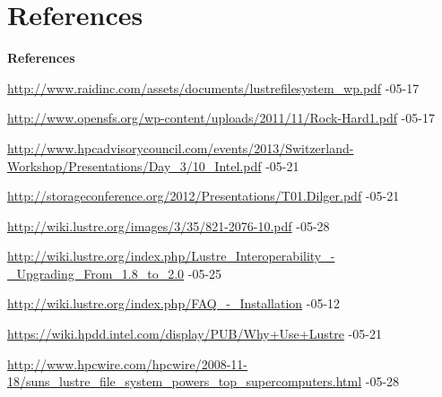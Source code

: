 \section{References}

\begin{frame}{\textbf{References}}
    \scriptsize
    \begin{thebibliography}{1}
        \beamertemplatetextbibitems

            \url{http://www.raidinc.com/assets/documents/lustrefilesystem_wp.pdf} -05-17

            \url{http://www.opensfs.org/wp-content/uploads/2011/11/Rock-Hard1.pdf} -05-17

            \url{http://www.hpcadvisorycouncil.com/events/2013/Switzerland-Workshop/Presentations/Day_3/10_Intel.pdf} -05-21

            \url{http://storageconference.org/2012/Presentations/T01.Dilger.pdf} -05-21

            \url{http://wiki.lustre.org/images/3/35/821-2076-10.pdf} -05-28

            \url{http://wiki.lustre.org/index.php/Lustre_Interoperability_-_Upgrading_From_1.8_to_2.0} -05-25

            \url{http://wiki.lustre.org/index.php/FAQ_-_Installation} -05-12

            \url{https://wiki.hpdd.intel.com/display/PUB/Why+Use+Lustre} -05-21

            \url{http://www.hpcwire.com/hpcwire/2008-11-18/suns_lustre_file_system_powers_top_supercomputers.html} -05-28

    \end{thebibliography}
\end{frame}
